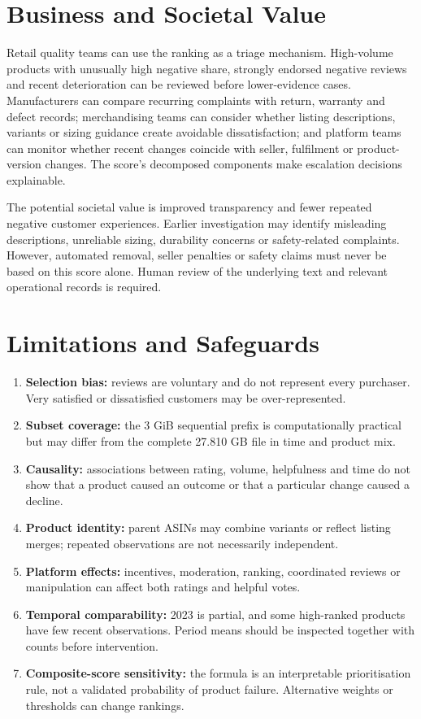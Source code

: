 \documentclass[10pt,a4paper]{article}
\begin{document}
\newpage
\section{Business and Societal Value}

Retail quality teams can use the ranking as a triage mechanism. High-volume products with unusually high negative share, strongly endorsed negative reviews and recent deterioration can be reviewed before lower-evidence cases. Manufacturers can compare recurring complaints with return, warranty and defect records; merchandising teams can consider whether listing descriptions, variants or sizing guidance create avoidable dissatisfaction; and platform teams can monitor whether recent changes coincide with seller, fulfilment or product-version changes. The score's decomposed components make escalation decisions explainable.

The potential societal value is improved transparency and fewer repeated negative customer experiences. Earlier investigation may identify misleading descriptions, unreliable sizing, durability concerns or safety-related complaints. However, automated removal, seller penalties or safety claims must never be based on this score alone. Human review of the underlying text and relevant operational records is required.

\section{Limitations and Safeguards}

\begin{enumerate}
\item \textbf{Selection bias:} reviews are voluntary and do not represent every purchaser. Very satisfied or dissatisfied customers may be over-represented.
\item \textbf{Subset coverage:} the 3 GiB sequential prefix is computationally practical but may differ from the complete 27.810 GB file in time and product mix.
\item \textbf{Causality:} associations between rating, volume, helpfulness and time do not show that a product caused an outcome or that a particular change caused a decline.
\item \textbf{Product identity:} parent ASINs may combine variants or reflect listing merges; repeated observations are not necessarily independent.
\item \textbf{Platform effects:} incentives, moderation, ranking, coordinated reviews or manipulation can affect both ratings and helpful votes.
\item \textbf{Temporal comparability:} 2023 is partial, and some high-ranked products have few recent observations. Period means should be inspected together with counts before intervention.
\item \textbf{Composite-score sensitivity:} the formula is an interpretable prioritisation rule, not a validated probability of product failure. Alternative weights or thresholds can change rankings.
\end{enumerate}
\end{document}
